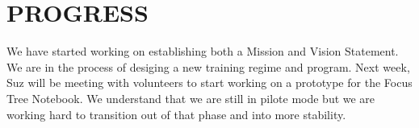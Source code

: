 \documentclass{article}\usepackage[]{graphicx}\usepackage[]{color}
\begin{document}
\section*{PROGRESS}
We have started working on establishing both a Mission and Vision Statement. We are in the process of desiging a new training regime and program. Next week, Suz will be meeting with volunteers to start working on a prototype for the Focus Tree Notebook. We understand that we are still in pilote mode but we are working hard to transition out of that phase and into more stability. 
\end{document}
